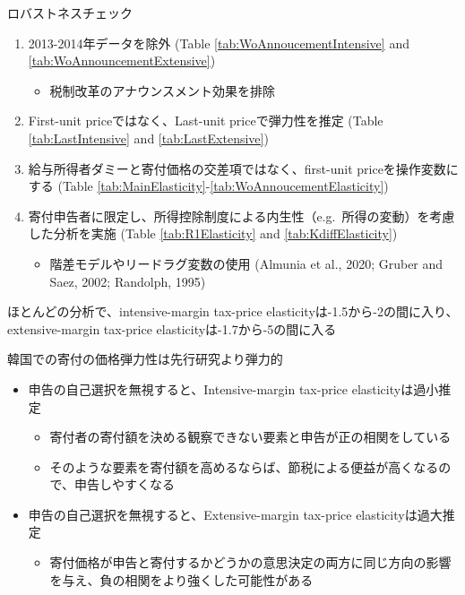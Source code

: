 \documentclass[
  ignorenonframetext,
  aspectratio=169,
]{beamer}
\providecommand{\tightlist}{%
  \setlength{\itemsep}{0pt}\setlength{\parskip}{0pt}}
\begin{document}
\begin{frame}{ロバストネスチェック}
\protect\hypertarget{ux30edux30d0ux30b9ux30c8ux30cdux30b9ux30c1ux30a7ux30c3ux30af}{}
\begin{enumerate}
\tightlist
\item
  2013-2014年データを除外 (Table \ref{tab:WoAnnoucementIntensive} and \ref{tab:WoAnnouncementExtensive})

  \begin{itemize}
  \tightlist
  \item
    税制改革のアナウンスメント効果を排除
  \end{itemize}
\item
  First-unit priceではなく、Last-unit priceで弾力性を推定 (Table \ref{tab:LastIntensive} and \ref{tab:LastExtensive})
\item
  給与所得者ダミーと寄付価格の交差項ではなく、first-unit priceを操作変数にする (Table \ref{tab:MainElasticity}-\ref{tab:WoAnnoucementElasticity})
\item
  寄付申告者に限定し、所得控除制度による内生性（e.g.~所得の変動）を考慮した分析を実施 (Table \ref{tab:R1Elasticity} and \ref{tab:KdiffElasticity})

  \begin{itemize}
  \tightlist
  \item
    階差モデルやリードラグ変数の使用 (Almunia et al., 2020; Gruber and Saez, 2002; Randolph, 1995)
  \end{itemize}
\end{enumerate}

ほとんどの分析で、intensive-margin tax-price elasticityは-1.5から-2の間に入り、
extensive-margin tax-price elasticityは-1.7から-5の間に入る
\end{frame}

\begin{frame}{韓国での寄付の価格弾力性は先行研究より弾力的}
\protect\hypertarget{ux97d3ux56fdux3067ux306eux5bc4ux4ed8ux306eux4fa1ux683cux5f3eux529bux6027ux306fux5148ux884cux7814ux7a76ux3088ux308aux5f3eux529bux7684}{}
\begin{itemize}
\tightlist
\item
  申告の自己選択を無視すると、Intensive-margin tax-price elasticityは過小推定

  \begin{itemize}
  \tightlist
  \item
    寄付者の寄付額を決める観察できない要素と申告が正の相関をしている
  \item
    そのような要素を寄付額を高めるならば、節税による便益が高くなるので、申告しやすくなる
  \end{itemize}
\item
  申告の自己選択を無視すると、Extensive-margin tax-price elasticityは過大推定

  \begin{itemize}
  \tightlist
  \item
    寄付価格が申告と寄付するかどうかの意思決定の両方に同じ方向の影響を与え、負の相関をより強くした可能性がある
  \end{itemize}
\end{itemize}
\end{frame}
\end{document}
